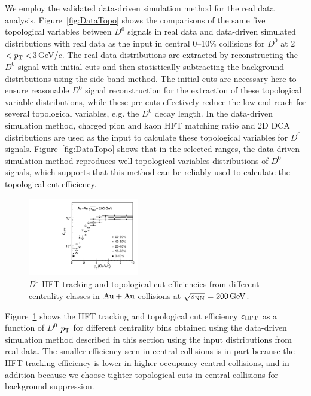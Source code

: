 \documentclass[%
 reprint,	
 amsmath,amssymb,
 aps,
 prc,
]{revtex4-1}
\begin{document}
We employ the validated data-driven simulation method for the real data analysis. Figure~\ref{fig:DataTopo} shows the comparisons of the same five topological variables between $D^0$ signals in real data and data-driven simulated distributions with real data as the input in central 0--10\% collisions for $D^0$ at 2$<p_{\rm T}<$3\,GeV/$c$. The real data distributions are extracted by reconstructing the $D^0$ signal with initial cuts and then statistically subtracting the background distributions using the side-band method. The initial cuts are necessary here to ensure reasonable $D^0$ signal reconstruction for the extraction of these topological variable distributions, while these pre-cuts effectively reduce the low end reach for several topological variables, e.g. the $D^0$ decay length. In the data-driven simulation method, charged pion and kaon HFT matching ratio and 2D DCA distributions are used as the input to calculate these topological variables for $D^0$ signals. Figure~\ref{fig:DataTopo} shows that in the selected ranges, the data-driven simulation method reproduces well topological variables distributions of $D^0$ signals, which supports that this method can be reliably used to calculate the topological cut efficiency.

\begin{figure}[h]
\centering
\includegraphics[width=0.43\textwidth]{fig/Datad0Eff_hftTopo_10.pdf}
\caption{$D^{0}$ HFT tracking and topological cut efficiencies from different centrality classes in ${\rm{Au + Au}}$ collisions at ${\sqrt{s_{\rm NN}} = \rm{200\,GeV}}$.}
\label{fig:Datad0Eff_hftTopo} 
\end{figure}


Figure~\ref{fig:Datad0Eff_hftTopo} shows the HFT tracking and topological cut efficiency $\varepsilon_{\rm HFT}$ as a function of $D^0$ $p_{\rm T}$ for different centrality bins obtained using the data-driven simulation method described in this section using the input distributions from real data. The smaller efficiency seen in central collisions is in part because the HFT tracking efficiency is lower in higher occupancy central collisions, and in addition because we choose tighter topological cuts in central collisions for background suppression.
\end{document}
